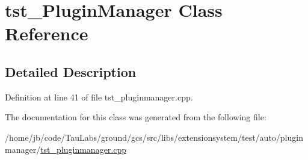 \hypertarget{classtst___plugin_manager}{\section{tst\-\_\-\-Plugin\-Manager \-Class \-Reference}
\label{classtst___plugin_manager}
}


\subsection{\-Detailed \-Description}


\-Definition at line 41 of file tst\-\_\-pluginmanager.\-cpp.



\-The documentation for this class was generated from the following file\-:\begin{DoxyCompactItemize}
\item 
/home/jb/code/\-Tau\-Labs/ground/gcs/src/libs/extensionsystem/test/auto/pluginmanager/\hyperlink{tst__pluginmanager_8cpp}{tst\-\_\-pluginmanager.\-cpp}\end{DoxyCompactItemize}

